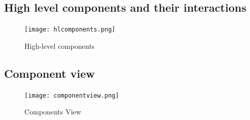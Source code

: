 \documentclass[12pt, letterpaper]{article}
\begin{document}
\subsection{High level components and their interactions}

\begin{figure}[h]
\centering
\texttt{[image: hlcomponents.png]}
\caption{High-level components}
\label{fig:hlcomp}
\end{figure}

\subsection{Component view}

\begin{figure}[h]
\centering
\texttt{[image: componentview.png]} %
\caption{Components View}
\label{fig:compview}
\end{figure}
\end{document}
